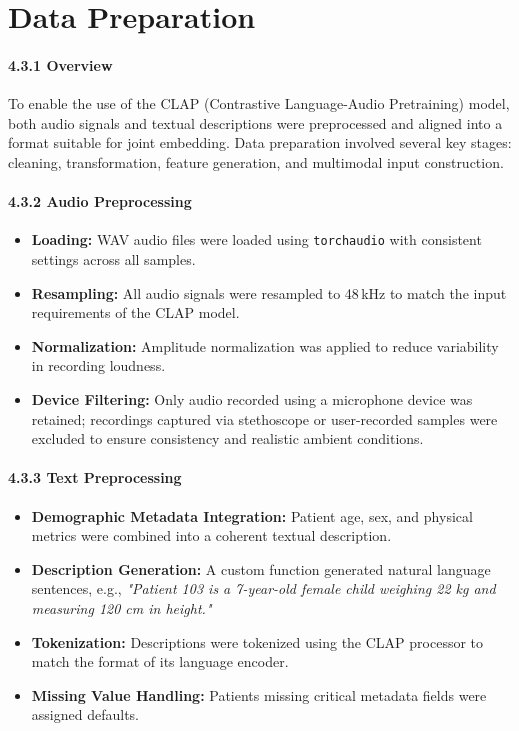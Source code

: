 \section{Data Preparation}

\paragraph{4.3.1 Overview\\}
To enable the use of the CLAP (Contrastive Language-Audio Pretraining) model, both audio signals and textual descriptions were preprocessed and aligned into a format suitable for joint embedding. Data preparation involved several key stages: cleaning, transformation, feature generation, and multimodal input construction.

\paragraph{4.3.2 Audio Preprocessing\\}
\begin{itemize}
    \item \textbf{Loading:} WAV audio files were loaded using \texttt{torchaudio} with consistent settings across all samples.
    \item \textbf{Resampling:} All audio signals were resampled to 48\,kHz to match the input requirements of the CLAP model.
    \item \textbf{Normalization:} Amplitude normalization was applied to reduce variability in recording loudness.
    \item \textbf{Device Filtering:} Only audio recorded using a microphone device was retained; recordings captured via stethoscope or user-recorded samples were excluded to ensure consistency and realistic ambient conditions.
\end{itemize}

\paragraph{4.3.3 Text Preprocessing\\}
\begin{itemize}
    \item \textbf{Demographic Metadata Integration:} Patient age, sex, and physical metrics were combined into a coherent textual description.
    \item \textbf{Description Generation:} A custom function generated natural language sentences, e.g., \textit{"Patient 103 is a 7-year-old female child weighing 22 kg and measuring 120 cm in height."}
    \item \textbf{Tokenization:} Descriptions were tokenized using the CLAP processor to match the format of its language encoder.
    \item \textbf{Missing Value Handling:} Patients missing critical metadata fields were assigned defaults.
\end{itemize}

